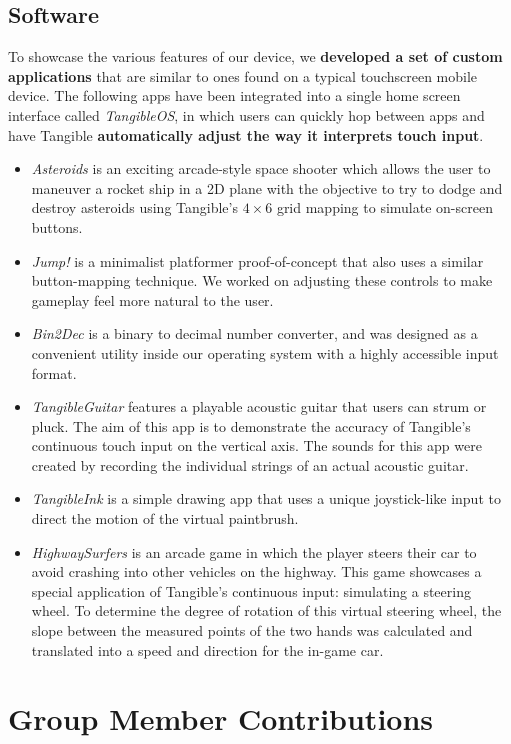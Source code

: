 \documentclass{article}
\begin{document}
\subsection{Software}
To showcase the various features of our device, we \textbf{developed a set of custom applications} that are similar to ones found on a typical touchscreen mobile device. The following apps have been integrated into a single home screen interface called \textit{TangibleOS}, in which users can quickly hop between apps and have Tangible \textbf{automatically adjust the way it interprets touch input}.
\begin{itemize}
    \item \textit{Asteroids} is an exciting arcade-style space shooter which allows the user to maneuver a rocket ship in a 2D plane with the objective to try to dodge and destroy asteroids using Tangible’s $4\times6$ grid mapping to simulate on-screen buttons.
    \item \textit{Jump!} is a minimalist platformer proof-of-concept that also uses a similar button-mapping technique. We worked on adjusting these controls to make gameplay feel more natural to the user.
    \item \textit{Bin2Dec} is a binary to decimal number converter, and was designed as a convenient utility inside our operating system with a highly accessible input format. 
    \item \textit{TangibleGuitar} features a playable acoustic guitar that users can strum or pluck. The aim of this app is to demonstrate the accuracy of Tangible’s continuous touch input on the vertical axis. The sounds for this app were created by recording the individual strings of an actual acoustic guitar.
    \item \textit{TangibleInk} is a simple drawing app that uses a unique joystick-like input to direct the motion of the virtual paintbrush.
    \item \textit{HighwaySurfers} is an arcade game in which the player steers their car to avoid crashing into other vehicles on the highway. This game showcases a special application of Tangible’s continuous input: simulating a steering wheel. To determine the degree of rotation of this virtual steering wheel, the slope between the measured points of the two hands was calculated and translated into a speed and direction for the in-game car.
\end{itemize}

\section{Group Member Contributions}
\end{document}
